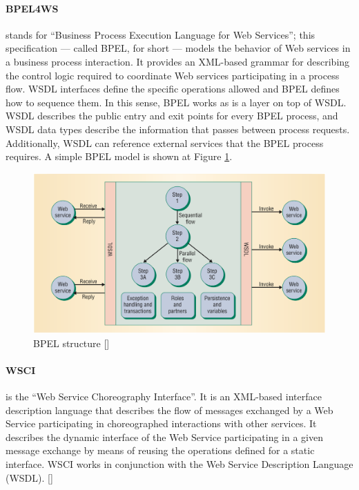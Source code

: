 \paragraph{BPEL4WS} 
stands for ``Business Process Execution Language for Web Services''; this specification — called BPEL, for short — models the behavior of Web services in a business process interaction. It provides an XML-based grammar for describing the control logic required to coordinate Web services participating in a process flow. WSDL interfaces define the specific operations allowed and BPEL defines how to sequence them. In this sense, BPEL works as is a layer on top of WSDL. WSDL describes the public entry and exit points for every BPEL process, and WSDL data types describe the information that passes between process requests. Additionally, WSDL can reference external services that the BPEL process requires. A simple BPEL model is shown at Figure \ref{BPELstructure}.

\begin{figure}[htb]
  \centering
  \includegraphics[width=\textwidth]{images/BPELstructure}
  \caption{BPEL structure [\citet{WSOC}]}
  \label{BPELstructure}
\end{figure}

\paragraph{WSCI}
is the ``Web Service Choreography Interface''. It is an XML-based interface description language that describes the flow of messages exchanged by a Web Service participating in choreographed interactions with other services. It describes the dynamic interface of the Web Service participating in a given message exchange by means of reusing the operations defined for a static interface. WSCI works in conjunction with the Web Service Description Language (WSDL). [\citet{WSCI}]

